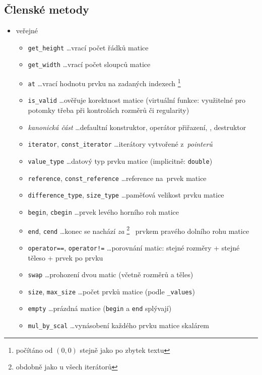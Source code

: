 \documentclass[11pt,a4paper]{article}
\theoremstyle{remark}
\begin{document}
\subsection{Členské metody}

\begin{itemize}
  \item veřejné
  \begin{itemize}
    \item \verb=get_height= \ldots vrací počet řádků matice
    \item \verb=get_width= \ldots vrací počet sloupců matice
    \item \verb=at= \ldots vrací hodnotu prvku na zadaných
      indexech\thinspace%
      \footnote{počítáno od $(0,0)$ stejně jako po zbytek textu}
    \item \verb=is_valid= \ldots ověřuje korektnost matice (virtuální funkce:
      vy\-u\-ži\-tel\-né pro potomky třeba při kontrolách rozměrů či
      regularity)
    \item \emph{kanonická část\/} \ldots defaultní konstruktor, operátor
      přiřazení, , destruktor
    \item \verb=iterator=, \verb=const_iterator= \ldots iterátory vytvořené
      z~\emph{pointerů\/}
    \item \verb=value_type= \ldots datový typ prvku matice (implicitně:
      \verb=double=)
    \item \verb=reference=, \verb=const_reference= \ldots reference na~prvek
      matice
    \item \verb=difference_type=, \verb=size_type= \ldots paměťová velikost
      prvku matice
    \item \verb=begin=, \verb=cbegin= \ldots prvek levého horního roh matice
    \item \verb=end=, \verb=cend= \ldots konec se nachází
      \emph{za\/}\thinspace%
      \footnote{obdobně jako u všech iterátorů}
      ~prvkem pravého dolního rohu matice
    \item \verb~operator==~, \verb~operator!=~ \ldots porovnání matic: stejné
      rozměry + stejné těleso + prvek po prvku
    \item \verb~swap~ \ldots prohození dvou matic (včetně rozměrů a těles)
    \item \verb~size~, \verb~max_size~ \ldots počet prvků matice (podle
      \verb~_values~)
    \item \verb~empty~ \ldots prázdná matice (\verb=begin= a \verb=end=
      splývají)
    \item \verb~mul_by_scal~ \ldots vynásobení každého prvku matice skalárem

\end{itemize}
\end{itemize}
\end{document}
